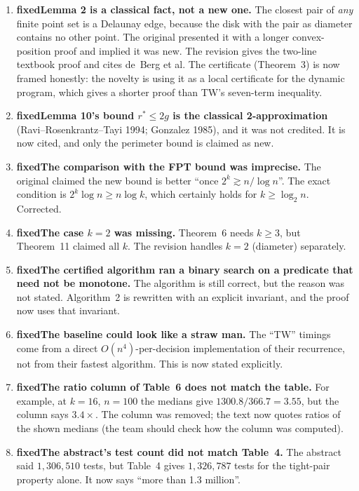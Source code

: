 \documentclass[11pt,a4paper]{article}
\newcommand{\ok}{\textcolor{green!45!black}{\textbf{fixed}}}
\begin{document}
\begin{enumerate}[label=\arabic*.]
\item \ok\quad \textbf{Lemma 2 is a classical fact, not a new one.} The closest pair
  of \emph{any} finite point set is a Delaunay edge, because the disk with the pair as
  diameter contains no other point. The original presented it with a longer
  convex-position proof and implied it was new. The revision gives the two-line
  textbook proof and cites de~Berg et al. The certificate (Theorem~3) is now framed
  honestly: the novelty is using it as a local certificate for the dynamic program,
  which gives a shorter proof than TW's seven-term inequality.
\item \ok\quad \textbf{Lemma 10's bound $r^*\le 2g$ is the classical
  2-approximation} (Ravi--Rosenkrantz--Tayi 1994; Gonzalez 1985), and it was not
  credited. It is now cited, and only the perimeter bound is claimed as new.
\item \ok\quad \textbf{The comparison with the FPT bound was imprecise.} The original
  claimed the new bound is better ``once $2^k\gtrsim n/\log n$''. The exact condition
  is $2^k\log n\ge n\log k$, which certainly holds for $k\ge\log_2 n$. Corrected.
\item \ok\quad \textbf{The case $k=2$ was missing.} Theorem~6 needs $k\ge3$, but
  Theorem~11 claimed all $k$. The revision handles $k=2$ (diameter) separately.
\item \ok\quad \textbf{The certified algorithm ran a binary search on a predicate that
  need not be monotone.} The algorithm is still correct, but the reason was not
  stated. Algorithm~2 is rewritten with an explicit invariant, and the proof now uses
  that invariant.
\item \ok\quad \textbf{The baseline could look like a straw man.} The ``TW''
  timings come from a direct $O(n^4)$-per-decision implementation of their
  recurrence, not from their fastest algorithm. This is now stated explicitly.
\item \ok\quad \textbf{The ratio column of Table~6 does not match the table.} For
  example, at $k=16$, $n=100$ the medians give $1300.8/366.7=3.55$, but the column
  says $3.4\times$. The column was removed; the text now quotes ratios of the shown
  medians (the team should check how the column was computed).
\item \ok\quad \textbf{The abstract's test count did not match Table~4.} The abstract
  said $1{,}306{,}510$ tests, but Table~4 gives $1{,}326{,}787$ tests for the
  tight-pair property alone. It now says ``more than 1.3 million''.

\end{enumerate}
\end{document}
